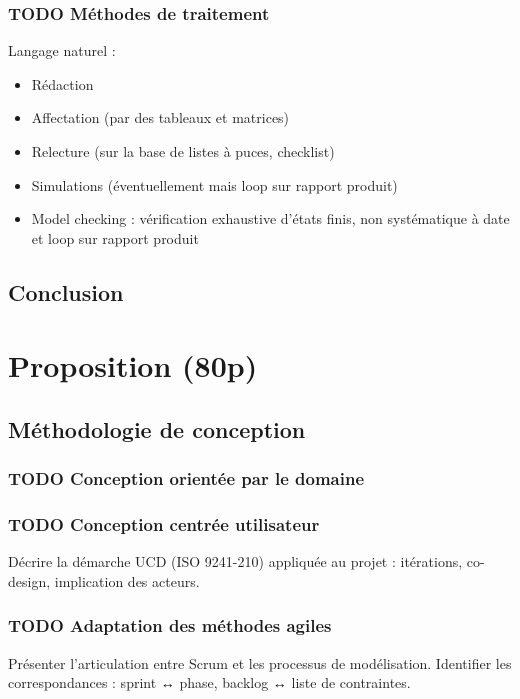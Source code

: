 \documentclass[a4paper,12pt]{article}
\begin{document}
\subsubsection{{\bfseries\sffamily TODO} Méthodes de traitement}
\label{sec:orgca4ced3}
Langage naturel :
\begin{itemize}
\item Rédaction
\item Affectation (par des tableaux et matrices)
\item Relecture (sur la base de listes à puces, checklist)
\item Simulations (éventuellement mais loop sur rapport produit)
\item Model checking : vérification exhaustive d'états finis, non systématique à date et loop sur rapport produit
\end{itemize}
\subsection{Conclusion}
\label{sec:org0b24503}
\clearpage
\section{Proposition (80p)}
\label{sec:org8b0fa9d}
\subsection{Méthodologie de conception}
\label{sec:org57edf46}
\subsubsection{{\bfseries\sffamily TODO} Conception orientée par le domaine}
\label{sec:org92a6666}

\subsubsection{{\bfseries\sffamily TODO} Conception centrée utilisateur}
\label{sec:org83a1c50}
Décrire la démarche UCD (ISO 9241-210) appliquée au projet : itérations, co-design, implication des acteurs.
\subsubsection{{\bfseries\sffamily TODO} Adaptation des méthodes agiles}
\label{sec:orgfb40dcb}
Présenter l’articulation entre Scrum et les processus de modélisation.  
Identifier les correspondances : sprint ↔ phase, backlog ↔ liste de contraintes.
\end{document}
